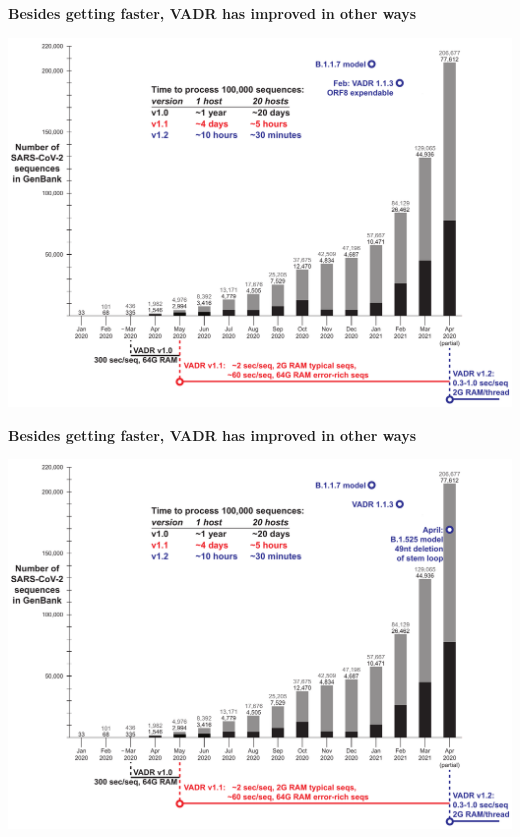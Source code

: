 \documentclass[landscape]{slides}
\begin{document}
\begin{slide}
\begin{center}
\textbf{Besides getting faster, VADR has improved in other ways}

\includegraphics[width=10.25in]{figs/sars-counts-jan2020-apr2021-slide5}

\end{center}

\vfill
\end{slide}
\begin{slide}
\begin{center}
\textbf{Besides getting faster, VADR has improved in other ways}

\includegraphics[width=10.25in]{figs/sars-counts-jan2020-apr2021-slide6}

\end{center}

\vfill
\end{slide}
\end{document}
